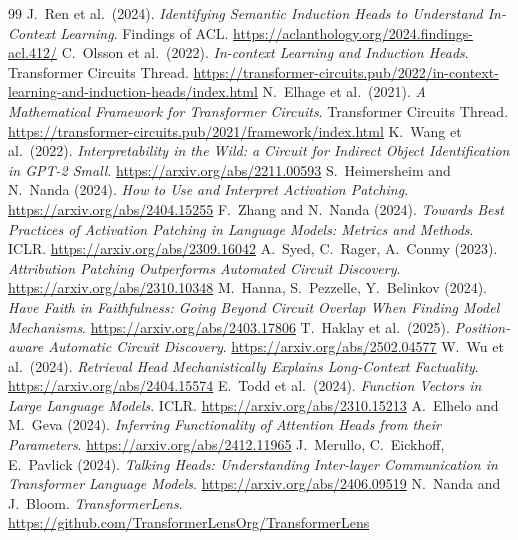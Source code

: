 \documentclass[11pt,a4paper]{article}
\begin{document}
\begin{thebibliography}{99}
 J.~Ren et al.\ (2024). \emph{Identifying Semantic Induction Heads to Understand In-Context Learning}. Findings of ACL. \url{https://aclanthology.org/2024.findings-acl.412/}
 C.~Olsson et al.\ (2022). \emph{In-context Learning and Induction Heads}. Transformer Circuits Thread. \url{https://transformer-circuits.pub/2022/in-context-learning-and-induction-heads/index.html}
 N.~Elhage et al.\ (2021). \emph{A Mathematical Framework for Transformer Circuits}. Transformer Circuits Thread. \url{https://transformer-circuits.pub/2021/framework/index.html}
 K.~Wang et al.\ (2022). \emph{Interpretability in the Wild: a Circuit for Indirect Object Identification in GPT-2 Small}. \url{https://arxiv.org/abs/2211.00593}
 S.~Heimersheim and N.~Nanda (2024). \emph{How to Use and Interpret Activation Patching}. \url{https://arxiv.org/abs/2404.15255}
 F.~Zhang and N.~Nanda (2024). \emph{Towards Best Practices of Activation Patching in Language Models: Metrics and Methods}. ICLR. \url{https://arxiv.org/abs/2309.16042}
 A.~Syed, C.~Rager, A.~Conmy (2023). \emph{Attribution Patching Outperforms Automated Circuit Discovery}. \url{https://arxiv.org/abs/2310.10348}
 M.~Hanna, S.~Pezzelle, Y.~Belinkov (2024). \emph{Have Faith in Faithfulness: Going Beyond Circuit Overlap When Finding Model Mechanisms}. \url{https://arxiv.org/abs/2403.17806}
 T.~Haklay et al.\ (2025). \emph{Position-aware Automatic Circuit Discovery}. \url{https://arxiv.org/abs/2502.04577}
 W.~Wu et al.\ (2024). \emph{Retrieval Head Mechanistically Explains Long-Context Factuality}. \url{https://arxiv.org/abs/2404.15574}
 E.~Todd et al.\ (2024). \emph{Function Vectors in Large Language Models}. ICLR. \url{https://arxiv.org/abs/2310.15213}
 A.~Elhelo and M.~Geva (2024). \emph{Inferring Functionality of Attention Heads from their Parameters}. \url{https://arxiv.org/abs/2412.11965}
 J.~Merullo, C.~Eickhoff, E.~Pavlick (2024). \emph{Talking Heads: Understanding Inter-layer Communication in Transformer Language Models}. \url{https://arxiv.org/abs/2406.09519}
 N.~Nanda and J.~Bloom. \emph{TransformerLens}. \url{https://github.com/TransformerLensOrg/TransformerLens}
\end{thebibliography}
\end{document}
